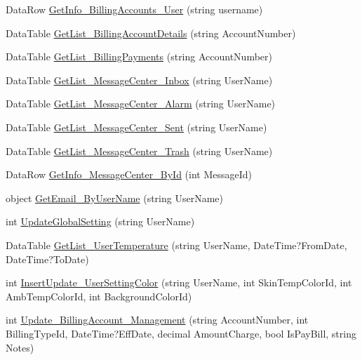 \begin{DoxyCompactItemize}
\item 
Data\-Row \hyperlink{class_d_b_class_a2fc3997462f0ee4b552309ea63529a3a}{Get\-Info\-\_\-\-Billing\-Accounts\-\_\-\-User} (string username)
\item 
Data\-Table \hyperlink{class_d_b_class_a0401b205dab60659fa1b0d5e08a6380e}{Get\-List\-\_\-\-Billing\-Account\-Details} (string Account\-Number)
\item 
Data\-Table \hyperlink{class_d_b_class_a1325a85d94c5ca023962fe8b9be00d20}{Get\-List\-\_\-\-Billing\-Payments} (string Account\-Number)
\item 
Data\-Table \hyperlink{class_d_b_class_a8cc689495dd00f72cbb7ce4a1cf49e83}{Get\-List\-\_\-\-Message\-Center\-\_\-\-Inbox} (string User\-Name)
\item 
Data\-Table \hyperlink{class_d_b_class_a20a41495a3c7eeeb6e5d514374533e45}{Get\-List\-\_\-\-Message\-Center\-\_\-\-Alarm} (string User\-Name)
\item 
Data\-Table \hyperlink{class_d_b_class_ac6c5150b83d380d419fe3f2c21115e75}{Get\-List\-\_\-\-Message\-Center\-\_\-\-Sent} (string User\-Name)
\item 
Data\-Table \hyperlink{class_d_b_class_a945f0e551b6a114e9fc29a5a38928535}{Get\-List\-\_\-\-Message\-Center\-\_\-\-Trash} (string User\-Name)
\item 
Data\-Row \hyperlink{class_d_b_class_af0371885100aee5897fad3d19f1cabc4}{Get\-Info\-\_\-\-Message\-Center\-\_\-\-By\-Id} (int Message\-Id)
\item 
object \hyperlink{class_d_b_class_a708536f33fd79b8bbe0ddaff66ed643b}{Get\-Email\-\_\-\-By\-User\-Name} (string User\-Name)
\item 
int \hyperlink{class_d_b_class_a5be6a98dd7109e6bae4e4ff3ba9ef06a}{Update\-Global\-Setting} (string User\-Name)
\item 
Data\-Table \hyperlink{class_d_b_class_ac0a226a5b8778e0aa4bff3db3d0abb45}{Get\-List\-\_\-\-User\-Temperature} (string User\-Name, Date\-Time?From\-Date, Date\-Time?To\-Date)
\item 
int \hyperlink{class_d_b_class_a2efd80a5427a8bedc880acefd862553b}{Insert\-Update\-\_\-\-User\-Setting\-Color} (string User\-Name, int Skin\-Temp\-Color\-Id, int Amb\-Temp\-Color\-Id, int Background\-Color\-Id)
\item 
int \hyperlink{class_d_b_class_a3a0623cddd000fbd65ef3fbfc118e09d}{Update\-\_\-\-Billing\-Account\-\_\-\-Management} (string Account\-Number, int Billing\-Type\-Id, Date\-Time?Eff\-Date, decimal Amount\-Charge, bool Is\-Pay\-Bill, string Notes)
\item 

\end{DoxyCompactItemize}
